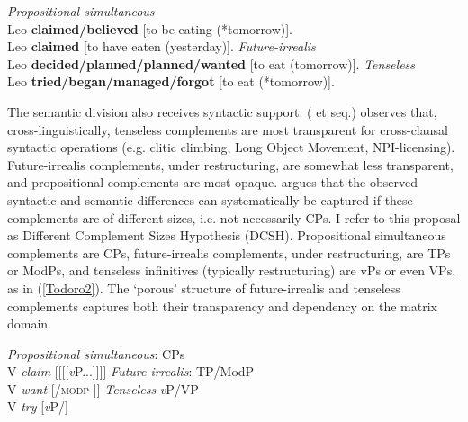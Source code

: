 \documentclass[output=paper]{langscibook}
\begin{document}
\begin{exe}
\ex \label{Todoro1}
\begin{xlist}
\ex \label{Todoro1a}
\emph{Propositional simultaneous} \\
    Leo \textbf{claimed/believed} [to be eating (*tomorrow)].\\
    Leo \textbf{claimed} [to have eaten (yesterday)].
\ex \label{Todoro1b}
\emph{Future-irrealis} \\
Leo \textbf{decided/planned/planned/wanted} [to eat	(tomorrow)].
\ex \label{Todoro1c}
\emph{Tenseless} \\
    Leo \textbf{tried/began/managed/forgot} [to eat (*tomorrow)].	\\
    \hfill \citep{wurmbrand2014a}
\end{xlist}
\end{exe}

The semantic division also receives syntactic support. \citeauthor{wurmbrand2001a} (\citeyear{wurmbrand2001a} et seq.) observes that, cross-linguistically, tenseless complements are most transparent for cross-clausal syntactic operations (e.g. clitic climbing, Long Object Movement, NPI-licensing). Future-irrealis complements, under restructuring, are somewhat less transparent, and propositional complements are most opaque. \citeauthor{wurmbrand2001a} argues that the observed syntactic and semantic differences can systematically be captured if these complements are of different sizes, i.e. not necessarily CPs. I refer to this proposal as Different Complement Sizes Hypothesis (DCSH). Propositional simultaneous complements are CPs, future-irrealis complements, under restructuring, are TPs or ModPs, and tenseless infinitives (typically restructuring) are vPs or even VPs, as in (\ref{Todoro2}). The ‘porous’ structure of future-irrealis and tenseless complements captures both their transparency and dependency on the matrix domain.

\begin{exe}
\ex \label{Todoro2}
\begin{xlist}
\ex \label{Todoro2a}
\emph{Propositional simultaneous}: CPs \\
    V \emph{claim} [{\CP}[{\tp}[{\aspp}[{\textit{v}P}...]]]]
\ex \label{Todoro2b}
\emph{Future-irrealis}: TP/ModP \\
V \emph{want} [\tp/\textsc{modp} \woll [\aspp[\textit{v}P...]]]
\ex \label{Todoro2c}
\emph{Tenseless} \textit{v}P/VP \\
V \emph{try} [\textit{v}P/\vp]
\end{xlist}
\end{exe}
\end{document}
